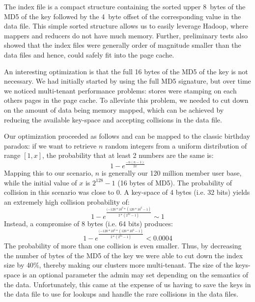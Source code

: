 The index file is a compact structure containing the sorted upper
8~bytes of the MD5 of the key followed by the 4~byte offset of the
corresponding value in the data file. This simple sorted structure
allows us to easily leverage Hadoop, where mappers and reducers do not
have much memory. Further, preliminary tests also showed that the
index files were generally order of magnitude smaller than the data
files and hence, could safely fit into the page cache.

An interesting optimization is that the full 16 bytes of the MD5 of
the key is not necessary. We had initially started by using the full
MD5 signature, but over time we noticed multi-tenant performance
problems: stores were stamping on each others pages in the page cache.
To alleviate this problem, we needed to cut down on the amount of data
being memory mapped, which can be achieved by reducing the available
key-space and accepting collisions in the data file. 

Our optimization proceeded as follows and can be mapped to the classic
birthday paradox: if we want to retrieve $n$ random integers from a
uniform distribution of range $[1, x]$, the probability that at least
2 numbers are the same is:
\begin{equation}
1 - e^{\frac{-n(n-1)}{2x}}
\end{equation}
Mapping this to our scenario, $n$ is generally our 120 million member
user base, while the initial value of $x$ is $2^{128} - 1$ (16 bytes
of MD5). The probability of collision in this scenario was close to 0.
A key-space of 4 bytes (i.e. 32 bits) yields an extremely high
collision probability of:
\begin{equation}
1 - e^{\frac{(-120*10^{6} * (120*10^{6} - 1)}{2 * (2^{32} - 1)}} \sim 1
\end{equation}
Instead, a compromise of 8 bytes (i.e. 64 bits) produces:
\begin{equation} 
1 - e^{\frac{(-120*10^{6} * (120*10^{6} - 1)} { 2 * (2^{64} - 1 )}} < 0.0004
\end{equation}
The probability of more than one collision is even smaller. Thus, by
decreasing the number of bytes of the MD5 of the key we were able to
cut down the index size by 40\%, thereby making our clusters more
multi-tenant. The size of the keys-space is an optional parameter the
admin may set depending on the semantics of the data. Unfortunately,
this came at the expense of us having to save the keys in the data
file to use for lookups and handle the rare collisions in the data
files.

